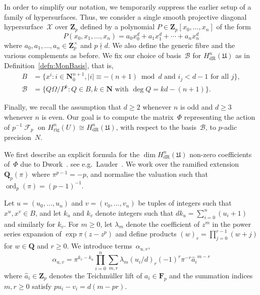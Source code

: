 \documentclass[a4paper,11pt]{article}
\numberwithin{equation}{section}
\providecommand{\abs}[1]{\lvert#1\rvert}                 %
\newcommand{\NN}{\mathbf{N}} %
\newcommand{\ZZ}{\mathbf{Z}} %
\newcommand{\QQ}{\mathbf{Q}} %
\DeclareMathOperator{\ord}{ord}          %
\DeclareMathOperator{\Frob}{\mathcal{F}} %
\providecommand{\HdR}{H_{\text{dR}}}    %
\providecommand{\Hrig}{H_{\text{rig}}}  %
\providecommand{\cB}{\mathcal{B}} %
\theoremstyle{definition}
\begin{document}
In order to simplify our notation, we temporarily suppress the earlier 
setup of a family of hypersurfaces. Thus, we consider a single smooth 
projective diagonal hypersurface~$\mathcal{X}$ over $\ZZ_p$ defined by 
a polynomial $P \in \ZZ_p[x_0, \dotsc, x_n]$ of the form
\begin{equation}
P(x_0, x_1, \dotsc, x_n) = 
    a_0 x_0^d + a_1 x_1^d + \dotsb + a_n x_n^d
\end{equation}
where $a_0, a_1, \dotsc, a_n \in \ZZ_p^{\times}$ and $p \nmid d$. 
We also define the generic fibre and the various complements as 
before.  We fix our choice of basis~$\cB$ for $\HdR^{n}(\mathfrak{U})$ 
as in Definition~\ref{defn:MonBasis}, that is, 
\begin{align}
B   & = \{ x^i : i \in \mathbf{N}_{0}^{n+1}, \abs{i} \equiv -(n+1) \bmod{d} \text{ and $i_j < d-1$ for all $j$}\}, \\
\cB & = \{ Q \Omega / P^k : \text{$Q \in B, k \in \NN$ with $\deg Q = kd - (n+1)$}\}.
\end{align}

Finally, we recall the assumption that $d \geq 2$ whenever $n$ is 
odd and $d \geq 3$ whenever $n$ is even.  Our goal is to compute 
the matrix~$\Phi$ representing the action of $p^{-1} \Frob_p$ on 
$\Hrig^n(U) \cong \HdR^n(\mathfrak{U})$, with respect to the basis~$\cB$, 
to $p$-adic precision~$N$.

We first describe an explicit formula for the $\dim \HdR^n(\mathfrak{U})$ 
non-zero coefficients of~$\Phi$ due to Dwork~\citep{Dwork1964}. 
see e.g.\ Lauder~\citep[\S 6.1]{Lauder2004b}.  
We work over the ramified extension~$\QQ_p(\pi)$ where $\pi^{p-1} = -p$, 
and normalise the valuation such that \mbox{$\ord_p(\pi) = (p-1)^{-1}$}.

Let $u = (u_0, \dotsc, u_n)$ and $v = (v_0, \dotsc, v_n)$ be tuples 
of integers such that $x^u, x^v \in B$,  and let $k_u$ and $k_v$ 
denote integers such that $d k_u = \sum_{i=0}^n (u_i + 1)$ and similarly 
for $k_v$.  For $m \geq 0$, let $\lambda_m$ denote the coefficient 
of $z^m$ in the power series expansion of $\exp \pi (z - z^p)$ and define 
products $(w)_r = \prod_{j=0}^{r-1} (w + j)$ for $w \in \QQ$ and $r \geq 0$. 
We introduce terms~$\alpha_{u,v}$, 
\begin{equation} \label{eq:alpha}
\alpha_{u,v} = \pi^{k_v - k_u} \prod_{i = 0}^n \sum_{m, r} \lambda_m (u_i / d)_r (-1)^r \pi^{-r} {\hat{a}_i}^{m-r}
\end{equation}
where $\hat{a}_i \in \ZZ_p$ denotes the Teichm\"uller lift of 
$a_i \in \mathbf{F}_p$ and the summation indices $m, r \geq 0$ 
satisfy $p u_i - v_i = d (m - pr)$.
\end{document}
